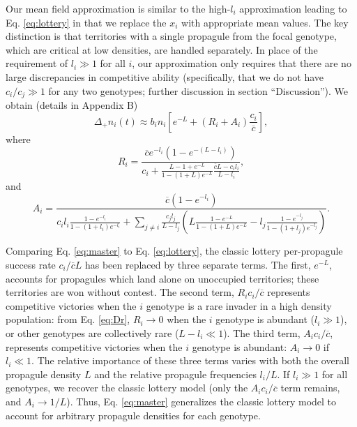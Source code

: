 \documentclass[11pt]{article}
\begin{document}
Our mean field approximation is similar to the high-$l_i$ approximation leading to Eq. \eqref{eq:lottery} in that we replace the $x_i$ with appropriate mean values. The key distinction is that territories with a single propagule from the focal genotype, which are critical at low densities, are handled separately. In place of the requirement of $l_i\gg 1$ for all $i$, our approximation only requires that there are no large discrepancies in competitive ability (specifically, that we do not have $c_i/c_j\gg 1$ for any two genotypes; further discussion in section ``Discussion''). We obtain (details in Appendix B)
\begin{equation}
\Delta_+ n_i(t)\approx b_i n_i\left[e^{-L}+(R_i+A_i)\frac{c_i}{\overline{c}}\right], \label{eq:master}
\end{equation}
where
\begin{equation}
R_i=\frac{\overline{c}e^{-l_i}(1-e^{-(L-l_i)})}{c_i +\frac{L-1+e^{-L}}{1-(1+L)e^{-L}}\frac{\overline{c}L- c_il_i}{L-l_i}},\label{eq:Dr}
\end{equation}
and
\begin{equation}
A_i=\frac{\overline{c}(1-e^{-l_i})}{c_il_i\frac{1-e^{-l_i}}{1-(1+l_i)e^{-l_i}}+\sum_{j\neq i}\frac{c_jl_j}{L-l_j}\left(L\frac{1-e^{-L}}{1-(1+L)e^{-L}}-l_j\frac{1-e^{-l_j}}{1-(1+l_j)e^{-l_j}}\right)}.\label{eq:Da}
\end{equation}

Comparing Eq. \eqref{eq:master} to Eq. \eqref{eq:lottery}, the classic lottery per-propagule success rate $c_i/\overline{c}L$ has been replaced by three separate terms. The first, $e^{-L}$, accounts for propagules which land alone on unoccupied territories; these territories are won without contest. The second term, $R_i c_i/\overline{c}$ represents competitive victories when the $i$ genotype is a rare invader in a high density population: from Eq. \eqref{eq:Dr}, $R_i\rightarrow 0$ when the $i$ genotype is abundant ($l_i\gg 1$), or other genotypes are collectively rare ($L-l_i\ll 1$). The third term, $A_ic_i/\overline{c}$, represents competitive victories when the $i$ genotype is abundant: $A_i\rightarrow 0$ if $l_i\ll 1$. The relative importance of these three terms varies with both the overall propagule density $L$ and the relative propagule frequencies $l_i/L$. If $l_i\gg 1$ for all genotypes, we recover the classic lottery model (only the $A_ic_i/\overline{c}$ term remains, and $A_i\rightarrow 1/L$). Thus, Eq. \eqref{eq:master} generalizes the classic lottery model to account for arbitrary propagule densities for each genotype. 
\end{document}
